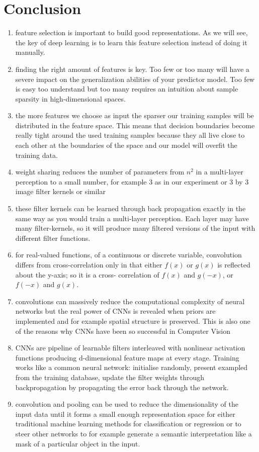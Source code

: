 \documentclass[11pt]{article}
\begin{document}
\section{Conclusion}

\begin{enumerate}
    \item feature selection is important to build good representations. As we will
    see, the key of deep learning is to learn this feature selection instead of     doing it manually. 
    \item finding the right amount of features is key. Too few or too many will have a severe impact on the generalization abilities of your predictor model. Too few is easy too understand but too many requires an intuition about sample sparsity in high-dimensional spaces.
    \item the more features we choose as input the sparser our training samples will be distributed in the feature space. This means that decision boundaries become really tight around the used training samples because they all live close to each other at the boundaries of the space and our model will overfit the training data.
    \item weight sharing reduces the number of parameters from $n^2$ in a multi-layer perception to a small number, for example 3 as in our experiment or 3 by 3 image filter kernels or similar
    \item these filter kernels can be learned through back propagation exactly in the same way as you would train a multi-layer perception. Each layer may have many filter-kernels, so it will produce many filtered versions of the input with different filter functions.
    \item for real-valued functions, of a continuous or discrete variable, convolution differs from cross-correlation only in that either $f(x)$ or $g(x)$ is reflected about the y-axis; so it is a cross- correlation of $f(x)$ and $g(-x)$, or $f(-x)$ and $g(x)$.
    \item convolutions can massively reduce the computational complexity of neural networks but the real power of CNNs is revealed when priors are implemented and for example spatial structure is preserved. This is also one of the reasons why CNNs have been so successful in Computer Vision
    \item CNNs are pipeline of learnable filters interleaved with nonlinear activation functions producing d-dimensional feature maps at every stage. Training works like a common neural network: initialise randomly, present exampled from the training database, update the filter weights through backpropagation by propagating the error back through the network.
    \item convolution and pooling can be used to reduce the dimensionality of the input data until it forms a small enough representation space for either traditional machine learning methods for classification or regression or to steer other networks to for example generate a semantic interpretation like a mask of a particular object in the input.
\end{enumerate}
 
\end{document}
